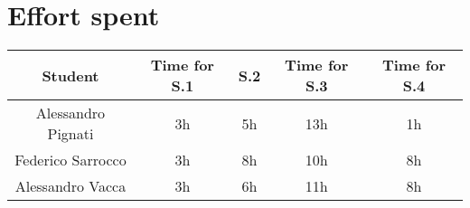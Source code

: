 \section{Effort spent}
\begin{tabular}{ | c || c | c | c | c|}
    \hline
    Student             & Time for S.1 & S.2 & Time for S.3 & Time for S.4 \\ \hline
    Alessandro Pignati  & 3h           & 5h  & 13h          & 1h           \\ \hline
    Federico Sarrocco   & 3h           & 8h  & 10h          & 8h           \\ \hline
    Alessandro Vacca    & 3h           & 6h  & 11h          & 8h           \\
    \hline
\end{tabular}